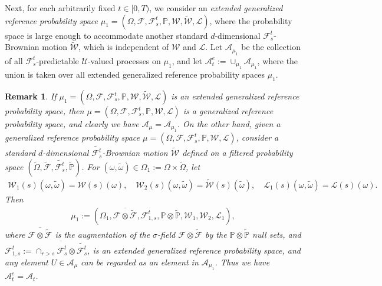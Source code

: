 \documentclass[amscd,amssymb,11pt]{article}
\newtheorem{remark}[theorem]{Remark}
\numberwithin{theorem}{section}
\numberwithin{equation}{section}
\begin{document}
Next, for each arbitrarily fixed $t\in[0,T)$, we consider an {\it extended generalized reference probability space} $\mu_{1}=(\Omega,\mathscr{F},\mathscr{F}_{s}^{t},\mathbb{P},\mathcal{W},\widetilde{\mathcal{W}},\mathcal{L})$, where the probability space is large enough to accommodate another standard $d$-dimensional $\mathscr{F}_{s}^{t}$-Brownian motion $\widetilde{\mathcal{W}}$, which is independent of $\mathcal{W}$ and $\mathcal{L}$. Let $\mathcal{A}_{\mu_{1}}$ be the collection of all $\mathscr{F}_{s}^{t}$-predictable $\mathcal{U}$-valued processes on $\mu_{1}$, and let $\mathcal{A}_{t}^{e}:=\cup_{\mu_1}\mathcal{A}_{\mu_{1}}$, where the union is taken over all extended generalized reference probability spaces $\mu_{1}$.
\begin{remark}\label{rem:EquiProbSpaces}
If $\mu_{1}=(\Omega,\mathscr{F},\mathscr{F}_{s}^{t},\mathbb{P},\mathcal{W},\widetilde{\mathcal{W}},\mathcal{L})$ is an extended generalized reference probability space, then $\mu=(\Omega,\mathscr{F},\mathscr{F}_{s}^{t},\mathbb{P},\mathcal{W},\mathcal{L})$ is a generalized reference probability space, and clearly we have $\mathcal{A}_{\mu}=\mathcal{A}_{\mu_1}$. On the other hand, given a generalized reference probability space $\mu=(\Omega,\mathscr{F},\mathscr{F}_{s}^{t},\mathbb{P},\mathcal{W},\mathcal{L})$, consider a standard $d$-dimensional
$\widetilde{\mathscr{F}_{s}^{t}}$-Brownian motion $\widetilde{\mathcal{W}}$ defined on a filtered probability space
$(\widetilde{\Omega},\widetilde{\mathscr{F}},\widetilde{\mathscr{F}_{s}^{t}},\widetilde{\mathbb{P}})$. For $(\omega,\widetilde{\omega})\in\Omega_{1}:=\Omega\times\widetilde{\Omega}$, let
\begin{align*}
\mathcal{W}_{1}(s)(\omega,\widetilde{\omega})=\mathcal{W}(s)(\omega),\quad\mathcal{W}_{2}(s)(\omega,\widetilde{\omega})=\widetilde{\mathcal{W}}(s)(\widetilde{\omega}),\quad\mathcal{L}_{1}(s)(\omega,\widetilde{\omega})=\mathcal{L}(s)(\omega).
\end{align*}
Then
\begin{align*}
\mu_{1}:=\left(\Omega_{1},\overline{\mathscr{F}\otimes\widetilde{\mathscr{F}}},\mathscr{F}_{1,s}^{t},\mathbb{P}\otimes\widetilde{\mathbb{P}},\mathcal{W}_{1},\mathcal{W}_{2},\mathcal{L}_{1}\right),
\end{align*}
where $\overline{\mathscr{F}\otimes\widetilde{\mathscr{F}}}$ is the augmentation of the $\sigma$-field $\mathscr{F}\otimes\widetilde{\mathscr{F}}$ by the $\mathbb{P}\otimes\widetilde{\mathbb{P}}$ null sets, and $\mathscr{F}_{1,s}^{t}:=\overline{\cap_{r>s}\mathscr{F}_{s}^{t}\otimes\widetilde{\mathscr{F}_{s}^{t}}}$, is an extended generalized reference probability space, and any element $U\in\mathcal{A}_{\mu}$ can be regarded as an element in $\mathcal{A}_{\mu_{1}}$. Thus we have $\mathcal{A}_{t}^{e}=\mathcal{A}_{t}$.
\end{remark}
\end{document}
